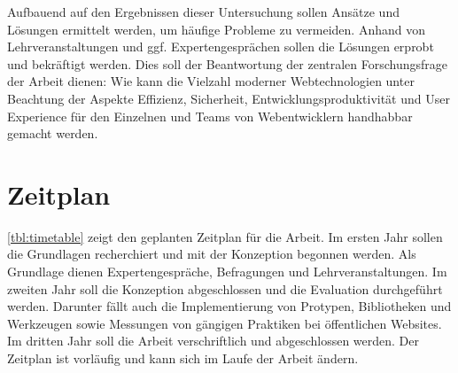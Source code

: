 Aufbauend auf den Ergebnissen dieser Untersuchung sollen Ansätze und Lösungen ermittelt werden, um häufige Probleme zu vermeiden.
Anhand von Lehrveranstaltungen und ggf. Expertengesprächen sollen die Lösungen erprobt und bekräftigt werden.
Dies soll der Beantwortung der zentralen Forschungsfrage der Arbeit dienen:
Wie kann die Vielzahl moderner Webtechnologien unter Beachtung der Aspekte Effizienz, Sicherheit, Entwicklungsproduktivität und User Experience für den Einzelnen und Teams von Webentwicklern handhabbar gemacht werden.

\section{Zeitplan}\label{sec:zeitplan}

\autoref{tbl:timetable} zeigt den geplanten Zeitplan für die Arbeit.
Im ersten Jahr sollen die Grundlagen recherchiert und mit der Konzeption begonnen werden.
Als Grundlage dienen Expertengespräche, Befragungen und Lehrveranstaltungen.
Im zweiten Jahr soll die Konzeption abgeschlossen und die Evaluation durchgeführt werden.
Darunter fällt auch die Implementierung von Protypen, Bibliotheken und Werkzeugen sowie Messungen von gängigen Praktiken bei öffentlichen Websites.
Im dritten Jahr soll die Arbeit verschriftlich und abgeschlossen werden.
Der Zeitplan ist vorläufig und kann sich im Laufe der Arbeit ändern.

